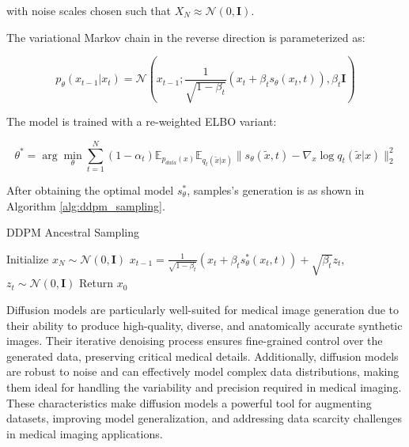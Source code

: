 \documentclass{article}
\begin{document}
with noise scales chosen such that $X_N \approx \mathcal{N}(0,\mathbf{I})$.

The variational Markov chain in the reverse direction is parameterized as:

\begin{equation}
p_\theta(x_{t-1}|x_t) = \mathcal{N}\left(x_{t-1}; \frac{1}{\sqrt{1-\beta_t}}(x_t + \beta_t s_\theta(x_t,t)), \beta_t\mathbf{I}\right)
\end{equation}

The model is trained with a re-weighted ELBO variant:

\begin{equation}
\theta^* = \arg\min_\theta \sum_{t=1}^N (1-\alpha_t) \mathbb{E}_{p_{data}(x)}\mathbb{E}_{q_t(\tilde{x}|x)} \| s_\theta(\tilde{x},t) - \nabla_x \log q_t(\tilde{x}|x) \|_2^2
\end{equation}

After obtaining the optimal model $s_\theta^*$, samples's generation is as shown in Algorithm \ref{alg:ddpm_sampling}. 

\begin{algorithm}[H]
\caption{DDPM Ancestral Sampling}
\label{alg:ddpm_sampling}
\begin{algorithmic}[1]
\STATE Initialize $x_N \sim \mathcal{N}(0,\mathbf{I})$
    \STATE $x_{t-1} = \frac{1}{\sqrt{1-\beta_t}}(x_t + \beta_t s_\theta^*(x_t,t)) + \sqrt{\beta_t}z_t$, $z_t \sim \mathcal{N}(0,\mathbf{I})$
\ENDFOR
\STATE Return $x_0$
\end{algorithmic}
\end{algorithm}

Diffusion models are particularly well-suited for medical image generation due to their ability to produce high-quality, diverse, and anatomically accurate synthetic images. Their iterative denoising process ensures fine-grained control over the generated data, preserving critical medical details. Additionally, diffusion models are robust to noise and can effectively model complex data distributions, making them ideal for handling the variability and precision required in medical imaging. These characteristics make diffusion models a powerful tool for augmenting datasets, improving model generalization, and addressing data scarcity challenges in medical imaging applications.



    
\end{document}
